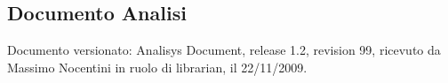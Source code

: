 \subsection{Documento Analisi}
Documento versionato: Analisys Document, release 1.2, revision 99, ricevuto da
Massimo Nocentini in ruolo di librarian, il 22/11/2009.